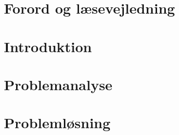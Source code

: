 



\frontmatter

 \clearpage 
\chapter*{Forord og læsevejledning}

\newpage

\tableofcontents*

\mainmatter

\chapter{Introduktion}\vspace{-.75cm}



\chapter{Problemanalyse}\vspace{-.75cm}









\chapter{Problemløsning}\vspace{-.75cm}


\begingroup
\raggedright


\endgroup

\begin{appendices}
	
\end{appendices}


